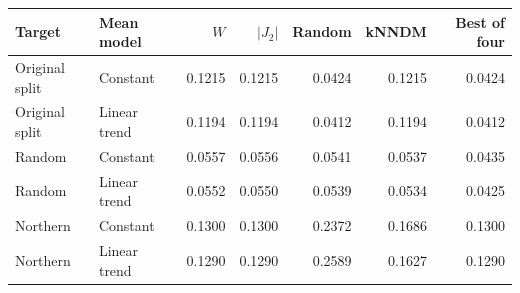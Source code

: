\begin{tabular}{llrrrrr}
\toprule
Target & Mean model & $W$ & $|J_2|$ & Random & kNNDM & Best of four \\
\midrule
Original split & Constant & 0.1215 & 0.1215 & 0.0424 & 0.1215 & 0.0424 \\
Original split & Linear trend & 0.1194 & 0.1194 & 0.0412 & 0.1194 & 0.0412 \\
Random & Constant & 0.0557 & 0.0556 & 0.0541 & 0.0537 & 0.0435 \\
Random & Linear trend & 0.0552 & 0.0550 & 0.0539 & 0.0534 & 0.0425 \\
Northern & Constant & 0.1300 & 0.1300 & 0.2372 & 0.1686 & 0.1300 \\
Northern & Linear trend & 0.1290 & 0.1290 & 0.2589 & 0.1627 & 0.1290 \\
\bottomrule
\end{tabular}
